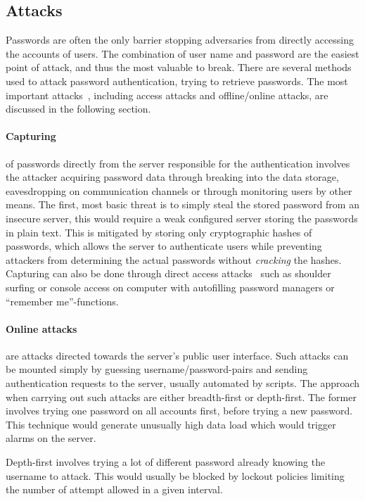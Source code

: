 \subsection{Attacks}\label{atck}
Passwords are often the only barrier stopping adversaries from directly accessing the accounts of users. The combination of user name and password are the easiest point of attack, and thus the most valuable to break. There are several methods used to attack password authentication, trying to retrieve passwords. The most important attacks~\cite{nist-guide, strong-pws_florencio}, including access attacks and offline/online attacks, are discussed in the following section. 
\paragraph{Capturing} of passwords directly from the server responsible for the authentication involves the attacker acquiring password data through breaking into the data storage, eavesdropping on communication channels or through monitoring users by other means. The first, most basic threat is to simply steal the stored password from an insecure server, this would require a weak configured server storing the passwords in plain text. This is mitigated by storing only cryptographic hashes of passwords, which allows the server to authenticate users while preventing attackers from determining the actual passwords without \emph{cracking} the hashes. Capturing can also be done through direct access attacks~\cite{guide-pws} such as shoulder surfing or console access on computer with autofilling password managers or ``remember me''-functions.

\paragraph{Online attacks} are attacks directed towards the server's public user interface. Such attacks can be mounted simply by guessing username/password-pairs and sending authentication requests to the server, usually automated by scripts. The approach when carrying out such attacks are either breadth-first or depth-first. The former involves trying one password on all accounts first, before trying a new password. This technique would generate unusually high data load which would trigger alarms on the server. 
\par Depth-first involves trying a lot of different password already knowing the username to attack. This would usually be blocked by lockout policies limiting the number of attempt allowed in a given interval.

